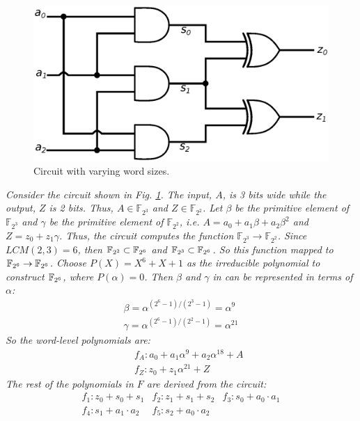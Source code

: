 \begin{Example}
\begin{figure}[!hbt]
\centerline{
\includegraphics[scale=0.4]{./figures/3to2.eps}
}
\caption{ Circuit with varying word sizes.}
\label{fig:3to2}
\end{figure}
{\it 
Consider the circuit shown in Fig. \ref{fig:3to2}. The input, $A$, is 3 bits 
wide while the output, $Z$ is 2 bits. Thus, $A\in {\mathbb{F}}_{2^3}$ and 
$Z \in {\mathbb{F}}_{2^2}$. Let $\beta$ be the primitive element of 
${\mathbb{F}}_{2^3}$ and $\gamma$ be the primitive element of 
${\mathbb{F}}_{2^2}$, i.e. $A=a_0+a_1\beta+a_2\beta^2$ and $Z=z_0+z_1\gamma$.
Thus, the circuit computes the function ${\mathbb{F}}_{2^3}\rightarrow{\mathbb{F}}_{2^2}$. Since $LCM(2,3)=6$, then ${\mathbb{F}}_{2^2} \subset {\mathbb{F}}_{2^6}$ and ${\mathbb{F}}_{2^3} \subset
{\mathbb{F}}_{2^6}$. So this function mapped to ${\mathbb{F}}_{2^6} \rightarrow {\mathbb{F}}_{2^6}$.
Choose $P(X)=X^6+X+1$ as the irreducible
polynomial to construct ${\mathbb{F}}_{2^6}$, where $P(\alpha)=0$. Then $\beta$ and
$\gamma$ in can be represented in terms of $\alpha$:
\begin{eqnarray}
\beta=\alpha^{(2^6-1)/(2^3-1)}=\alpha^9 \nonumber \\
\gamma=\alpha^{(2^6-1)/(2^2-1)}=\alpha^{21} 
\end{eqnarray}
So the word-level polynomials are:
\begin{eqnarray}
&&f_A: a_0+a_1\alpha^9+a_2\alpha^{18}+A \nonumber \\
&&f_Z: z_0+z_1\alpha^{21}+Z 
\end{eqnarray}
The rest of the polynomials in $F$ are derived from the circuit:
\begin{eqnarray}
f_1: z_0+s_0+s_1 & f_2: z_1+s_1+s_2 & f_3: s_0+a_0\cdot a_1 \nonumber \\
f_4: s_1+a_1\cdot a_2 & f_5: s_2+a_0\cdot a_2 &
\end{eqnarray}
}
\end{Example}
